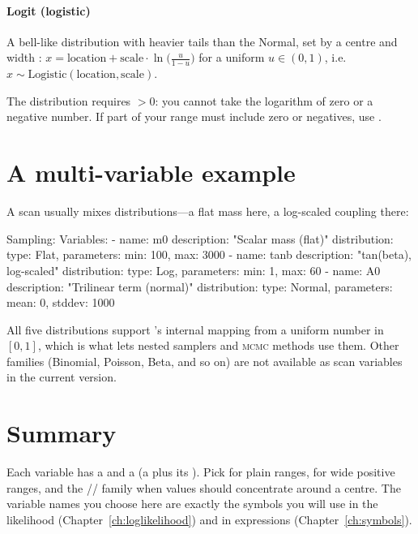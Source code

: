 \paragraph{Logit (logistic)} A bell-like distribution with heavier tails than the Normal, set by
a centre  and width :
$x = \mathrm{location} + \mathrm{scale}\cdot\ln\!\big(\tfrac{u}{1-u}\big)$ for a uniform
$u \in (0,1)$, i.e. $x \sim \mathrm{Logistic}(\mathrm{location}, \mathrm{scale})$.

\begin{jwarn}
The  distribution requires $>0$: you cannot take the logarithm of zero
or a negative number. If part of your range must include zero or negatives, use .
\end{jwarn}

\section{A multi-variable example}
\label{sec:var-example}

A scan usually mixes distributions---a flat mass here, a log-scaled coupling there:

\begin{yamlwin}
Sampling:
  Variables:
    - name: m0
      description: "Scalar mass (flat)"
      distribution: {type: Flat, parameters: {min: 100, max: 3000}}
    - name: tanb
      description: "tan(beta), log-scaled"
      distribution: {type: Log, parameters: {min: 1, max: 60}}
    - name: A0
      description: "Trilinear term (normal)"
      distribution: {type: Normal, parameters: {mean: 0, stddev: 1000}}
\end{yamlwin}

\begin{jnote}
All five distributions support \Jarvis's internal mapping from a uniform number in $[0,1]$, which
is what lets nested samplers and \textsc{mcmc} methods use them. Other families (Binomial,
Poisson, Beta, and so on) are not available as scan variables in the current version.
\end{jnote}

\section{Summary}
\label{sec:var-summary}

Each variable has a  and a  (a  plus its
). Pick  for plain ranges,  for wide positive
ranges, and the // family when values should
concentrate around a centre. The variable names you choose here are exactly the symbols you will
use in the likelihood (Chapter~\ref{ch:loglikelihood}) and in expressions
(Chapter~\ref{ch:symbols}).
